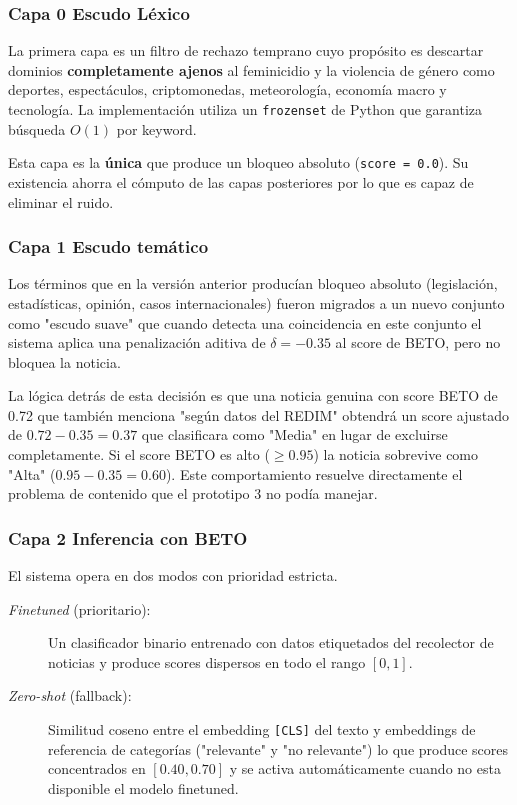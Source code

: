 \subsubsection{Capa 0 Escudo Léxico}
\label{subsubsec:capa0}

La primera capa es un filtro de rechazo temprano cuyo propósito es descartar
dominios \textbf{completamente ajenos} al feminicidio y la violencia de género
como deportes, espectáculos, criptomonedas, meteorología, economía macro y tecnología.
La implementación utiliza un \texttt{frozenset} de Python que garantiza búsqueda
$O(1)$ por keyword.

Esta capa es la \textbf{única} que produce un bloqueo absoluto
(\texttt{score = 0.0}). Su existencia ahorra el cómputo de las capas posteriores
por lo que es capaz de eliminar el ruido.

\subsubsection{Capa 1 Escudo temático}
\label{subsubsec:capa1}

Los términos que en la versión anterior producían bloqueo absoluto (legislación,
estadísticas, opinión, casos internacionales) fueron migrados a un nuevo conjunto
como "escudo suave" que cuando detecta una coincidencia en este conjunto el sistema
aplica una penalización aditiva de $\delta = -0.35$ al score de BETO, pero no
bloquea la noticia.

La lógica detrás de esta decisión es que una noticia genuina con score BETO
de 0.72 que también menciona "según datos del REDIM" obtendrá un score ajustado
de $0.72 - 0.35 = 0.37$ que clasificara como "Media" en lugar de excluirse
completamente. Si el score BETO es alto ($\geq 0.95$) la noticia sobrevive como
"Alta" ($0.95 - 0.35 = 0.60$). Este comportamiento resuelve directamente
el problema de contenido que el prototipo 3 no podía manejar.

\subsubsection{Capa 2 Inferencia con BETO}
\label{subsubsec:capa2}

El sistema opera en dos modos con prioridad estricta.

\begin{description}
    \item[\textit{Finetuned} (prioritario):] Un clasificador binario entrenado
    con datos etiquetados del recolector de noticias y produce scores dispersos
    en todo el rango $[0, 1]$.

    \item[\textit{Zero-shot} (fallback):] Similitud coseno entre el embedding
    \texttt{[CLS]} del texto y embeddings de referencia de categorías
    ("relevante" y "no relevante") lo que produce scores concentrados
    en $[0.40, 0.70]$ y se activa automáticamente cuando no esta disponible el modelo finetuned.
\end{description}

